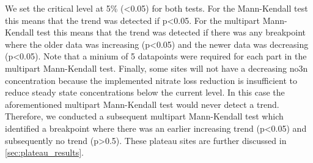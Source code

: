 We set the critical level at 5\% (<0.05) for both tests.
For the Mann-Kendall test this means that the trend was detected if p<0.05. For the multipart Mann-Kendall test this means that the trend was detected if there was any breakpoint where the older data was increasing (p<0.05) and the newer data was decreasing (p<0.05).
Note that a minium of 5 datapoints were required for each part in the multipart Mann-Kendall test.
Finally, some sites will not have a decreasing \gls{no3n} concentration because the implemented nitrate loss reduction is insufficient to reduce steady state concentrations below the current level.
In this case the aforementioned multipart Mann-Kendall test would never detect a trend.
Therefore, we conducted a subsequent multipart Mann-Kendall test which identified a breakpoint where there was an earlier increasing trend (p<0.05) and subsequently no trend (p>0.5). These plateau sites are further discussed in \autoref{sec:plateau_results}.

